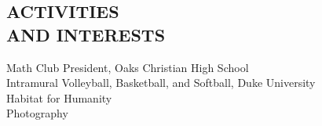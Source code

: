 \documentclass[line,margin]{res}
\begin{document}
\begin{resume}
\section{ACTIVITIES \\ AND INTERESTS}             
 			Math Club President, Oaks Christian High School \\
			Intramural Volleyball, Basketball, and Softball, Duke University \\
			Habitat for Humanity \\
			Photography
\end{resume}
\end{document}
